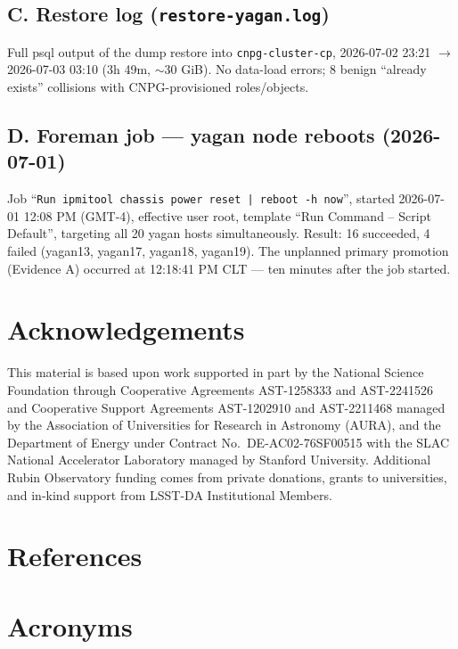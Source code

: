 \documentclass[PMO,authoryear,toc]{lsstdoc}
\begin{document}
\subsection{C. Restore log (\texttt{restore-yagan.log})}

Full psql output of the dump restore into \texttt{cnpg-cluster-cp}, 2026-07-02
23:21 $\rightarrow$ 2026-07-03 03:10 (3h 49m, $\sim$30 GiB). No data-load
errors; 8 benign ``already exists'' collisions with CNPG-provisioned
roles/objects.

\subsection{D. Foreman job --- yagan node reboots (2026-07-01)}

Job ``\texttt{Run ipmitool chassis power reset | reboot -h now}'', started
2026-07-01 12:08 PM (GMT-4), effective user root, template ``Run Command --
Script Default'', targeting all 20 yagan hosts simultaneously. Result: 16
succeeded, 4 failed (yagan13, yagan17, yagan18, yagan19). The unplanned
primary promotion (Evidence A) occurred at 12:18:41 PM CLT --- ten minutes
after the job started.

\section{Acknowledgements}

This material is based upon work supported in part by the National Science Foundation through Cooperative Agreements AST-1258333 and AST-2241526 and Cooperative Support Agreements AST-1202910 and AST-2211468 managed by the Association of Universities for Research in Astronomy (AURA), and the Department of Energy under Contract No.\ DE-AC02-76SF00515 with the SLAC National Accelerator Laboratory managed by Stanford University.
Additional Rubin Observatory funding comes from private donations, grants to universities, and in-kind support from LSST-DA Institutional Members.

\section{References} \label{sec:bib}
\renewcommand{\refname}{} %


\section{Acronyms} \label{sec:acronyms}

\end{document}
